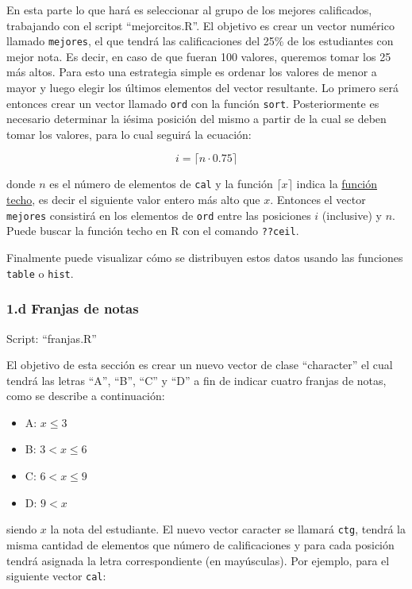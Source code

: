 \documentclass[]{article}
\begin{document}
En esta parte lo que hará es seleccionar al grupo de los mejores
calificados, trabajando con el script ``mejorcitos.R''. El objetivo es
crear un vector numérico llamado \texttt{mejores}, el que tendrá las
calificaciones del 25\% de los estudiantes con mejor nota. Es decir, en
caso de que fueran 100 valores, queremos tomar los 25 más altos. Para
esto una estrategia simple es ordenar los valores de menor a mayor y
luego elegir los últimos elementos del vector resultante. Lo primero
será entonces crear un vector llamado \texttt{ord} con la función
\texttt{sort}. Posteriormente es necesario determinar la iésima posición
del mismo a partir de la cual se deben tomar los valores, para lo cual
seguirá la ecuación:

\[i = \lceil { n \cdot 0.75 } \rceil\]

donde $n$ es el número de elementos de \texttt{cal} y la función
$\lceil x \rceil$ indica la
\href{https://es.wikipedia.org/wiki/Funciones\_de\_parte\_entera\#Funci.C3.B3n\_techo}{función
techo}, es decir el siguiente valor entero más alto que $x$. Entonces el
vector \texttt{mejores} consistirá en los elementos de \texttt{ord}
entre las posiciones $i$ (inclusive) y $n$. Puede buscar la función
techo en R con el comando \texttt{??ceil}.

Finalmente puede visualizar cómo se distribuyen estos datos usando las
funciones \texttt{table} o \texttt{hist}.

\subsubsection{1.d Franjas de notas}

Script: ``franjas.R''

El objetivo de esta sección es crear un nuevo vector de clase
``character'' el cual tendrá las letras ``A'', ``B'', ``C'' y ``D'' a
fin de indicar cuatro franjas de notas, como se describe a continuación:

\begin{itemize}
\item
  A: $x \leq 3$
\item
  B: $3 < x \leq 6$
\item
  C: $6 < x \leq 9$
\item
  D: $9 < x$
\end{itemize}
siendo $x$ la nota del estudiante. El nuevo vector caracter se llamará
\texttt{ctg}, tendrá la misma cantidad de elementos que número de
calificaciones y para cada posición tendrá asignada la letra
correspondiente (en mayúsculas). Por ejemplo, para el siguiente vector
\texttt{cal}:
\end{document}
